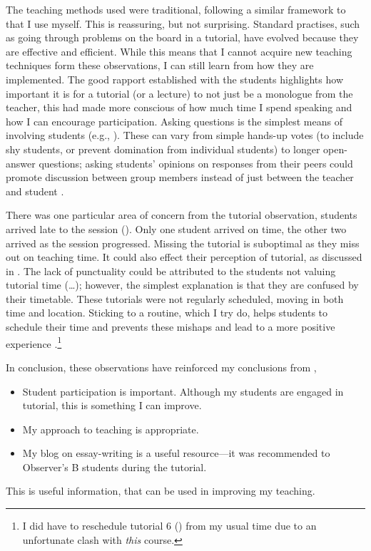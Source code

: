 The teaching methods used were traditional, following a similar framework to that I use myself. This is reassuring, but not surprising. Standard practises, such as going through problems on the board in a tutorial, have evolved because they are effective and efficient. While this means that I cannot acquire new teaching techniques form these observations, I can still learn from how they are implemented. The good rapport established with the students highlights how important it is for a tutorial (or a lecture) to not just be a monologue from the teacher, this had made more conscious of how much time I spend speaking and how I can encourage participation. Asking questions is the simplest means of involving students (e.g., ). These can vary from simple hands-up votes (to include shy students, or prevent domination from individual students) to longer open-answer questions; asking students' opinions on responses from their peers could promote discussion between group members instead of just between the teacher and student \citep[cf.]{Foster1981}. 

There was one particular area of concern from the tutorial observation, students arrived late to the session (). Only one student arrived on time, the other two arrived as the session progressed. Missing the tutorial is suboptimal as they miss out on teaching time. It could also effect their perception of tutorial, as discussed in . The lack of punctuality could be attributed to the students not valuing tutorial time (\ldots); however, the simplest explanation is that they are confused by their timetable. These tutorials were not regularly scheduled, moving in both time and location. Sticking to a routine, which I try do, helps students to schedule their time and prevents these mishaps and lead to a more positive experience \citep{Zaitseva2013}.\footnote{I did have to reschedule tutorial 6 () from my usual time due to an unfortunate clash with \emph{this} course.}

In conclusion, these observations have reinforced my conclusions from ,
\begin{itemize}
\item Student participation is important. Although my students are engaged in tutorial, this is something I can improve.
\item My approach to teaching is appropriate.
\item My blog on essay-writing is a useful resource---it was recommended to Observer's B students during the tutorial.
\end{itemize}
This is useful information, that can be used in improving my teaching.
